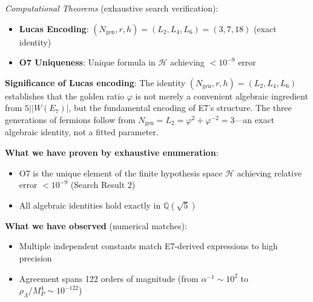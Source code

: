 \documentclass[11pt,a4paper]{article}
\begin{document}
\textit{Computational Theorems} (exhaustive search verification):
\begin{itemize}
\item \textbf{Lucas Encoding}: $(N_{\text{gen}}, r, h) = (L_2, L_4, L_6) = (3, 7, 18)$ (exact identity)
\item \textbf{O7 Uniqueness}: Unique formula in $\mathcal{H}$ achieving $< 10^{-9}$ error
\end{itemize}

\textbf{Significance of Lucas encoding}: The identity $(N_{\text{gen}}, r, h) = (L_2, L_4, L_6)$ establishes that the golden ratio $\varphi$ is not merely a convenient algebraic ingredient from $5 | |W(E_7)|$, but the fundamental encoding of E7's structure. The three generations of fermions follow from $N_{\text{gen}} = L_2 = \varphi^2 + \varphi^{-2} = 3$---an exact algebraic identity, not a fitted parameter.

\textbf{What we have proven by exhaustive enumeration}:
\begin{itemize}
\item O7 is the unique element of the finite hypothesis space $\mathcal{H}$ achieving relative error $< 10^{-9}$ (Search Result 2)
\item All algebraic identities hold exactly in $\mathbb{Q}(\sqrt{5})$
\end{itemize}

\textbf{What we have observed} (numerical matches):
\begin{itemize}
\item Multiple independent constants match E7-derived expressions to high precision
\item Agreement spans 122 orders of magnitude (from $\alpha^{-1} \sim 10^2$ to $\rho_\Lambda/M_P^4 \sim 10^{-122}$)
\end{itemize}
\end{document}
